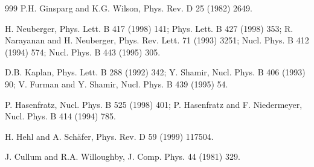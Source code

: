 \begin{thebibliography}{999}
      P.H. Ginsparg and K.G. Wilson, 
                      Phys. Rev. D 25 (1982) 2649.           %

                      H. Neuberger, 
                      Phys. Lett. B 417 (1998) 141;          %
                      Phys. Lett. B 427 (1998) 353;          %
                      R. Narayanan and H. Neuberger, 
                      Phys. Rev. Lett. 71 (1993) 3251;       %
                      Nucl. Phys. B 412 (1994) 574;          %
                      Nucl. Phys. B 443 (1995) 305.          %

                      D.B. Kaplan, 
                      Phys. Lett. B 288 (1992) 342;          %
                      Y. Shamir,
                      Nucl. Phys. B 406 (1993) 90;           %
                      V. Furman and Y. Shamir, 
                      Nucl. Phys. B 439 (1995) 54.           %

                      P. Hasenfratz, 
                      Nucl. Phys. B 525 (1998) 401;          %
                      P. Hasenfratz and F. Niedermeyer, 
                      Nucl. Phys. B 414 (1994) 785.          %

        H. Hehl and A. Sch\"afer,
                      Phys. Rev. D 59 (1999) 117504.

      J. Cullum and R.A. Willoughby, 
                      J. Comp. Phys. 44 (1981) 329.          %


\end{thebibliography}
